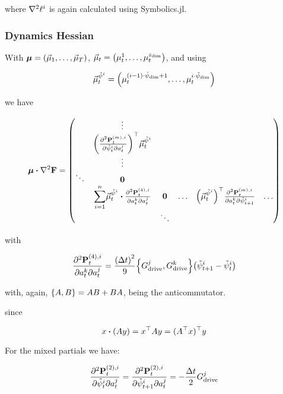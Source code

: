 \documentclass{article}
\newcommand{\isopsi}{\tilde \psi}
\begin{document}
where $\laplacian \ell^i$ is again calculated using \textsf{Symbolics.jl}.

\newpage
\subsubsection*{Dynamics Hessian}

With $\vb*{\mu} = \qty(\vec \mu_1, \dots, \vec \mu_T)$, $\vec\mu_t = \qty(\mu_t^1, \dots, \mu_t^{z_{\text{dim}}})$, and using

\begin{equation*}
\vec\mu_t^{\isopsi^i} = \qty(\mu_t^{(i - 1)\cdot \isopsi_{\dim} + 1}, \dots, \mu_t^{i\cdot\isopsi_{\dim}})
\end{equation*}

we have

\begin{equation}
  \vb*{\mu} \vdot \laplacian \vb{F} = \mqty(
    & \vdots & \\ 
    & \qty(\pdv{\vb{P}_t^{(m), i}}{\isopsi_t^i}{a^j_t})^\top \vec \mu^{\isopsi^i}_t \\
    & \vdots \\
    \ddots & \vb{0}\\
    & \displaystyle{\sum_{i=1}^n} \textstyle{\vec\mu_t^{\isopsi^i} \vdot \pdv{\vb{P}_t^{(4), i}}{a_t^k}{a_t^j}} & \vb{0} & \hdots & \qty(\vec \mu^{\isopsi^i}_t)^\top \pdv{\vb{P}_t^{(m), i}}{a^k_t}{\isopsi_{t+1}^i} & \hdots \\
    & & \ddots \\
  )
\end{equation}

with

\begin{equation}
  \pdv{\vb{P}_t^{(4), i}}{a_t^k}{a_t^j} = \frac{\qty(\Delta t)^2}{9}\qty{G^j_{\text{drive}}, G^k_{\text{drive}}} \qty(\isopsi^i_{t+1} - \isopsi^i_t)
\end{equation}

\hfill

with, again, $\qty{A, B} = AB + BA$, being the anticommutator.

\hfill

since

$$
x \vdot (Ay) = x^\top A y = (A^\top x)^\top y
$$

For the mixed partials we have:

\begin{equation}
  \pdv{\vb{P}_t^{(2), i}}{\isopsi_t^i}{a^j_t} = \pdv{\vb{P}_t^{(2), i}}{\isopsi_{t+1}^i}{a^j_t} = -\frac{\Delta t}{2} G^j_{\text{drive}}
\end{equation}
\end{document}
